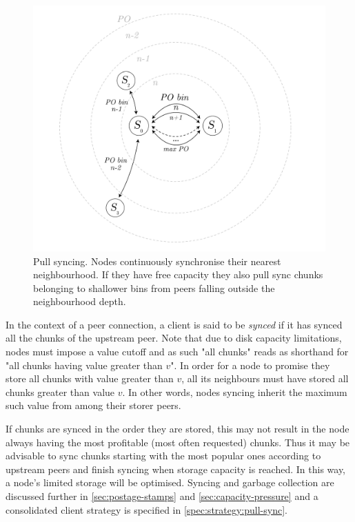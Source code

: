 \begin{figure}[htbp]
   \centering
   \includegraphics[width=\textwidth]{fig/pull-sync.pdf}
   \caption[Pull syncing \statusgreen]{Pull syncing. Nodes continuously synchronise their nearest neighbourhood. If they have free capacity they also pull sync chunks belonging to shallower bins from peers falling outside the neighbourhood depth.}
   \label{fig:pull-syncing}
\end{figure}

In the context of a peer connection, a client is said to be \emph{synced} if it has synced all the chunks of the upstream peer. Note that due to disk capacity limitations, nodes must impose a value cutoff and as such "all chunks" reads as shorthand for "all chunks having value greater than $v$". In order for a node to promise they store all chunks with value greater than $v$, all its neighbours must have stored all chunks greater than value $v$. In other words, nodes syncing inherit the maximum such value from among their storer peers. 

If chunks are synced in the order they are stored, this may not result in the node always having the most profitable (most often requested) chunks. Thus it may be advisable to sync chunks starting with the most popular ones according to upstream peers and finish syncing when storage capacity is reached. In this way, a node's limited storage will be optimised. Syncing and garbage collection are discussed further in \ref{sec:postage-stamps} and \ref{sec:capacity-pressure} and a consolidated client strategy is specified in \ref{spec:strategy:pull-sync}.

